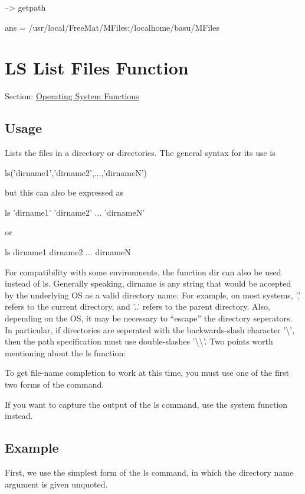 \begin{DoxyVerbInclude}
--> getpath

ans = 
/usr/local/FreeMat/MFiles:/localhome/basu/MFiles
\end{DoxyVerbInclude}
 \hypertarget{os_ls}{}\section{L\-S List Files Function}\label{os_ls}
Section\-: \hyperlink{sec_os}{Operating System Functions} \hypertarget{vtkwidgets_vtkxyplotwidget_Usage}{}\subsection{Usage}\label{vtkwidgets_vtkxyplotwidget_Usage}
Lists the files in a directory or directories. The general syntax for its use is \begin{DoxyVerb}  ls('dirname1','dirname2',...,'dirnameN')
\end{DoxyVerb}
 but this can also be expressed as \begin{DoxyVerb}  ls 'dirname1' 'dirname2' ... 'dirnameN'
\end{DoxyVerb}
 or \begin{DoxyVerb}  ls dirname1 dirname2 ... dirnameN
\end{DoxyVerb}
 For compatibility with some environments, the function {\ttfamily dir} can also be used instead of {\ttfamily ls}. Generally speaking, {\ttfamily dirname} is any string that would be accepted by the underlying O\-S as a valid directory name. For example, on most systems, {\ttfamily '.'} refers to the current directory, and {\ttfamily '..'} refers to the parent directory. Also, depending on the O\-S, it may be necessary to ``escape'' the directory seperators. In particular, if directories are seperated with the backwards-\/slash character {\ttfamily '\textbackslash{}'}, then the path specification must use double-\/slashes {\ttfamily '\textbackslash{}\textbackslash{}'}. Two points worth mentioning about the {\ttfamily ls} function\-: 
\begin{DoxyItemize}
\item To get file-\/name completion to work at this time, you must use one of the first two forms of the command.  
\item If you want to capture the output of the {\ttfamily ls} command, use the {\ttfamily system} function instead.  
\end{DoxyItemize}\hypertarget{variables_struct_Example}{}\subsection{Example}\label{variables_struct_Example}
First, we use the simplest form of the {\ttfamily ls} command, in which the directory name argument is given unquoted.


